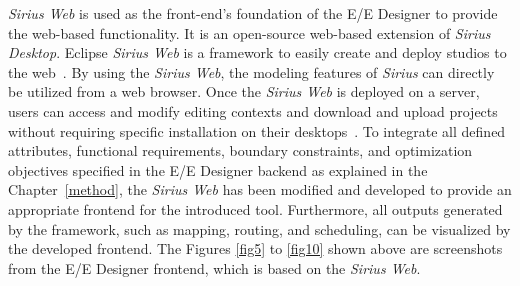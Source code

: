      \textit{Sirius Web} is used as the front-end's foundation of the E/E Designer to provide the web-based functionality. It is an open-source web-based extension of \textit{Sirius Desktop}. Eclipse \textit{Sirius Web} is a framework to easily create and deploy studios to the web~\cite{siriusweb}.
     By using the \textit{Sirius Web}, the modeling features of \textit{Sirius} can directly be utilized from a web browser. Once the \textit{Sirius Web} is deployed on a server, %
     users can access and modify editing contexts and download and upload projects without requiring specific installation on their desktops~\cite{siriusweb}.
     To integrate all defined attributes, functional requirements, boundary constraints, and optimization objectives specified in the E/E Designer backend as explained in the Chapter~\ref{method}, the \textit{Sirius Web} has been modified and developed to provide an appropriate frontend for the introduced tool. Furthermore, all outputs generated by the framework, such as mapping, routing, and scheduling, can be visualized by the developed frontend. The Figures \ref{fig5} to \ref{fig10} shown above are screenshots from the E/E Designer frontend, which is based on the \textit{Sirius Web}.\newline 
     
    
